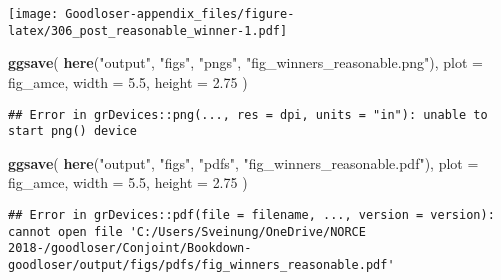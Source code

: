 \documentclass[]{book}
\newenvironment{Shaded}{\begin{snugshade}}{\end{snugshade}}
\newcommand{\KeywordTok}[1]{\textcolor[rgb]{0.13,0.29,0.53}{\textbf{#1}}}
\newcommand{\DataTypeTok}[1]{\textcolor[rgb]{0.13,0.29,0.53}{#1}}
\newcommand{\FloatTok}[1]{\textcolor[rgb]{0.00,0.00,0.81}{#1}}
\newcommand{\StringTok}[1]{\textcolor[rgb]{0.31,0.60,0.02}{#1}}
\newcommand{\NormalTok}[1]{#1}
\begin{document}
\texttt{[image: Goodloser-appendix\_files/figure-latex/306\_post\_reasonable\_winner-1.pdf]}

\begin{Shaded}
\begin{Highlighting}[]
\KeywordTok{ggsave}\NormalTok{(}
  \KeywordTok{here}\NormalTok{(}\StringTok{"output"}\NormalTok{, }\StringTok{"figs"}\NormalTok{, }\StringTok{"pngs"}\NormalTok{, }\StringTok{"fig_winners_reasonable.png"}\NormalTok{),}
  \DataTypeTok{plot =}\NormalTok{ fig_amce,}
  \DataTypeTok{width =} \FloatTok{5.5}\NormalTok{, }\DataTypeTok{height =} \FloatTok{2.75}
\NormalTok{)}
\end{Highlighting}
\end{Shaded}

\begin{verbatim}
## Error in grDevices::png(..., res = dpi, units = "in"): unable to start png() device
\end{verbatim}

\begin{Shaded}
\begin{Highlighting}[]
\KeywordTok{ggsave}\NormalTok{(}
  \KeywordTok{here}\NormalTok{(}\StringTok{"output"}\NormalTok{, }\StringTok{"figs"}\NormalTok{, }\StringTok{"pdfs"}\NormalTok{, }\StringTok{"fig_winners_reasonable.pdf"}\NormalTok{),}
  \DataTypeTok{plot =}\NormalTok{ fig_amce,}
  \DataTypeTok{width =} \FloatTok{5.5}\NormalTok{, }\DataTypeTok{height =} \FloatTok{2.75}
\NormalTok{)}
\end{Highlighting}
\end{Shaded}

\begin{verbatim}
## Error in grDevices::pdf(file = filename, ..., version = version): cannot open file 'C:/Users/Sveinung/OneDrive/NORCE 2018-/goodloser/Conjoint/Bookdown-goodloser/output/figs/pdfs/fig_winners_reasonable.pdf'
\end{verbatim}
\end{document}
